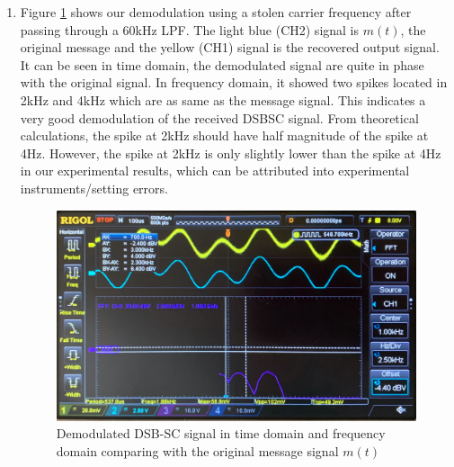 \documentclass[11pt]{article}
\begin{document}
\begin{enumerate}[label=(\alph*)]
\item %
Figure \ref{fig:q3c} shows our demodulation using a stolen carrier frequency after passing through a 60kHz LPF. The light blue (CH2) signal is $m(t)$, the original message and the yellow (CH1) signal is the recovered output signal. It can be seen in time domain, the demodulated signal are quite in phase with the original signal. In frequency domain, it showed two spikes located in 2kHz and 4kHz which are as same as the message signal. This indicates a very good demodulation of the received DSBSC signal. From theoretical calculations, the spike at 2kHz should have half magnitude of the spike at 4Hz. However, the spike at 2kHz is only slightly lower than the spike at 4Hz in our experimental results, which can be attributed into experimental instruments/setting errors. 
\begin{figure}[H]
    \centering
    \includegraphics[scale = 0.135]{Q3c.jpg}
    \caption{\label{fig:q3c}Demodulated DSB-SC signal in time domain and frequency domain comparing with the original message signal $m(t)$}
\end{figure}


\end{enumerate}
\end{document}
